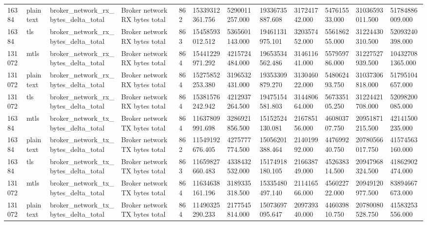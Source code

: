 \begin{longtable}{llllllllllll}
16384 & plaintext & broker\_network\_rx\_bytes\_delta\_total & Broker network RX bytes total & 862 & 15339312361.756 & 5290011257.000 & 19336735887.608 & 317241742.000 & 547615533.000 & 31036593011.500 & 51784886009.000 \\
16384 & tls & broker\_network\_rx\_bytes\_delta\_total & Broker network RX bytes total & 863 & 15458593012.512 & 5365601143.000 & 19461131975.101 & 320357452.000 & 556186255.000 & 31224430310.500 & 52093240398.000 \\
131072 & mtls & broker\_network\_rx\_bytes\_delta\_total & Broker network RX bytes total & 864 & 15441229971.292 & 4215724484.000 & 19653534562.486 & 314611641.000 & 557959786.000 & 31227527939.500 & 104327081365.000 \\
131072 & plaintext & broker\_network\_rx\_bytes\_delta\_total & Broker network RX bytes total & 864 & 15275852253.380 & 3196532431.000 & 19353309879.270 & 313046022.000 & 548062493.750 & 31037306818.000 & 51795104657.000 \\
131072 & tls & broker\_network\_rx\_bytes\_delta\_total & Broker network RX bytes total & 864 & 15381576242.942 & 4212937264.500 & 19475154581.803 & 314480664.000 & 567335105.250 & 31224421708.000 & 52098200085.000 \\
16384 & mtls & broker\_network\_tx\_bytes\_delta\_total & Broker network TX bytes total & 864 & 11637809991.698 & 3286921856.500 & 15152524130.081 & 216785156.000 & 460803707.750 & 20951871215.500 & 42141500235.000 \\
16384 & plaintext & broker\_network\_tx\_bytes\_delta\_total & Broker network TX bytes total & 862 & 11549192676.405 & 4275777774.500 & 15056201388.464 & 214019992.000 & 447699240.750 & 20780566017.750 & 41574563160.000 \\
16384 & tls & broker\_network\_tx\_bytes\_delta\_total & Broker network TX bytes total & 863 & 11659827660.483 & 4338432532.000 & 15174918180.105 & 216638749.000 & 452638314.500 & 20947968324.500 & 41862902474.000 \\
131072 & mtls & broker\_network\_tx\_bytes\_delta\_total & Broker network TX bytes total & 864 & 11634638161.196 & 3189335318.500 & 15335480497.140 & 211416566.000 & 456022722.000 & 20949120977.500 & 83894667673.000 \\
131072 & plaintext & broker\_network\_tx\_bytes\_delta\_total & Broker network TX bytes total & 864 & 11490325290.233 & 2177545814.000 & 15073697095.647 & 209739340.000 & 446039810.750 & 20780080528.750 & 41583253556.000 \\

\end{longtable}
